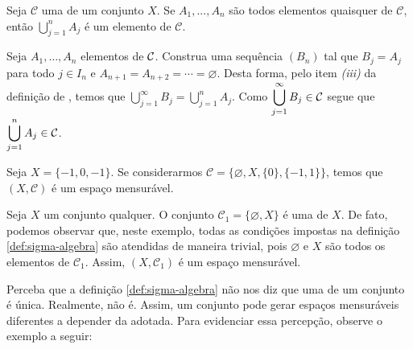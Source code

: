 \begin{proposition}
\label{prop:sigma-união-finita}
    Seja $\mathcal{C}$ uma \sigal de um conjunto $X$. Se $A_1, ..., A_n$ são todos elementos quaisquer de $\mathcal{C}$, então $\displaystyle \bigcup_{j = 1}^n A_j$ é um elemento de $\mathcal{C}$.
\end{proposition}
\begin{prova}
	Seja $A_1,\ldots, A_n$ elementos de $\operatorname{\mathcal{C}}$. 
	Construa uma sequência $(B_n)$ tal que $B_j = A_j$ para todo $j \in I_n$ e $A_{n + 1} = A_{n + 2} = \cdots = \varnothing$.
	Desta forma, pelo item \textit{(iii)} da definição de \sigal, temos que 
	$
	\displaystyle\bigcup_{j = 1}^\infty B_j = \bigcup_{j = 1}^n A_j
	$.
	Como $\displaystyle \bigcup_{j = 1}^\infty B_j \in \operatorname{\mathcal{C}} $ segue que 
	$\displaystyle \bigcup_{j = 1}^n A_j \in \operatorname{\mathcal{C}} $.
\end{prova}

% 
 
\begin{example}
    Seja $X = \{-1,0,-1\}$. Se considerarmos $\mathcal{C} = \{\varnothing, X, \{0\}, \{-1,1\}\}$, temos que $(X, \mathcal{C})$ é um espaço mensurável.
\end{example}

\begin{example}
\label{ex:sigma-trivial}
    Seja $X$ um conjunto qualquer.
    O conjunto $\mathcal{C}_1 = \{\varnothing, X\}$ é uma \sigal de $X$.
    De fato, podemos observar que, neste exemplo, todas as condições impostas na definição \ref{def:sigma-algebra} são atendidas de maneira trivial, pois 
    $\varnothing$ e $X$ são todos os elementos de $\mathcal{C}_1$. 
    Assim,  $(X, \mathcal{C}_1)$ é um espaço mensurável.
\end{example}

Perceba que a definição \ref{def:sigma-algebra} não nos diz que uma \sigal de um conjunto é única.
Realmente, não é. 
Assim, um conjunto pode gerar espaços mensuráveis diferentes a depender da \sigal adotada.
Para evidenciar essa percepção, observe o exemplo a seguir:


